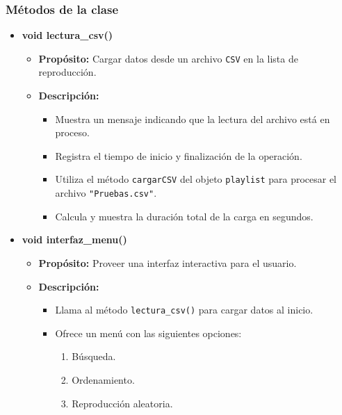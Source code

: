 \documentclass[corference]{IEEEtran}
\begin{document}
\begin{flushleft}
            \subsubsection{Métodos de la clase}
                \begin{itemize}
                    \item \textbf{void lectura\_csv()}
                    \begin{itemize}
                        \item \textbf{Propósito:} 
                        Cargar datos desde un archivo \texttt{CSV} en la lista de reproducción.
                        \item \textbf{Descripción:} 
                        \begin{itemize}
                            \item Muestra un mensaje indicando que la lectura del archivo está en proceso.
                            \item Registra el tiempo de inicio y finalización de la operación.
                            \item Utiliza el método \texttt{cargarCSV} del objeto \texttt{playlist} para procesar el archivo \texttt{"Pruebas.csv"}.
                            \item Calcula y muestra la duración total de la carga en segundos.
                        \end{itemize}
                    \end{itemize}
                \item \textbf{void interfaz\_menu()}
                \begin{itemize}
                    \item \textbf{Propósito:} 
                    Proveer una interfaz interactiva para el usuario.
                    \item \textbf{Descripción:} 
                    \begin{itemize}
                        \item Llama al método \texttt{lectura\_csv()} para cargar datos al inicio.
                        \item Ofrece un menú con las siguientes opciones:
                        \begin{enumerate}
                            \item Búsqueda.
                            \item Ordenamiento.
                            \item Reproducción aleatoria.

\end{enumerate}
\end{itemize}
\end{itemize}
\end{itemize}
\end{flushleft}
\end{document}
